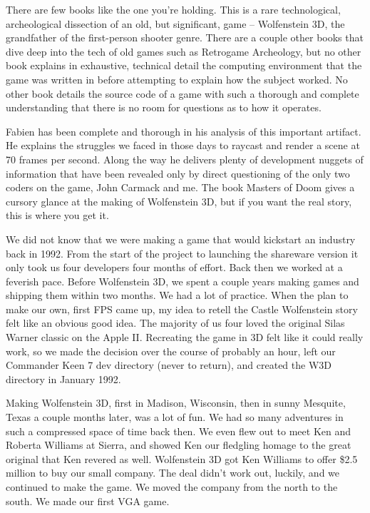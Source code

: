 There are few books like the one you're holding. This is a rare technological, archeological dissection of an old, but significant, game -- Wolfenstein 3D, the grandfather of the first-person shooter genre. There are a couple other books that dive deep into the tech of old games such as Retrogame Archeology, but no other book explains in exhaustive, technical detail the computing environment that the game was written in before attempting to explain how the subject worked. No other book details the source code of a game with such a thorough and complete understanding that there is no room for questions as to how it operates.\\
\par
Fabien has been complete and thorough in his analysis of this important artifact. He explains the struggles we faced in those days to raycast and render a scene at 70 frames per second. Along the way he delivers plenty of development nuggets of information that have been revealed only by direct questioning of the only two coders on the game, John Carmack and me. The book Masters of Doom gives a cursory glance at the making of Wolfenstein 3D, but if you want the real story, this is where you get it.\\
\par
We did not know that we were making a game that would kickstart an industry back in 1992. From the start of the project to launching the shareware version it only took us four developers four months of effort. Back then we worked at a feverish pace. Before Wolfenstein 3D, we spent a couple years making games and shipping them within two months. We had a lot of practice. When the plan to make our own, first FPS came up, my idea to retell the Castle Wolfenstein story felt like an obvious good idea. The majority of us four loved the original Silas Warner classic on the Apple II. Recreating the game in 3D felt like it could really work, so we made the decision over the course of probably an hour, left our Commander Keen 7 dev directory (never to return), and created the W3D directory in January 1992.\\
\par
Making Wolfenstein 3D, first in Madison, Wisconsin, then in sunny Mesquite, Texas a couple months later, was a lot of fun. We had so many adventures in such a compressed space of time back then. We even flew out to meet Ken and Roberta Williams at Sierra, and showed Ken our fledgling homage to the great original that Ken revered as well. Wolfenstein 3D got Ken Williams to offer \$2.5 million to buy our small company. The deal didn't work out, luckily, and we continued to make the game. We moved the company from the north to the south. We made our first VGA game.\\
